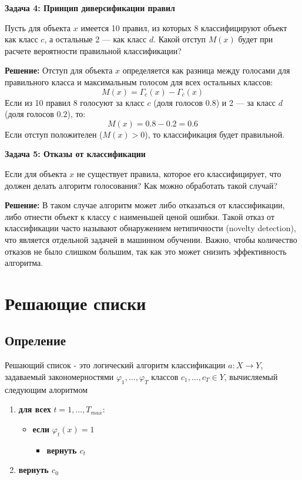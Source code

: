 \textbf{Задача 4: Принцип диверсификации правил}

Пусть для объекта $x$ имеется 10 правил, из которых 8 классифицируют объект как класс $c$, а остальные 2 — как класс $d$. Какой отступ $M(x)$ будет при расчете вероятности правильной классификации?

\textbf{Решение:}
Отступ для объекта $x$ определяется как разница между голосами для правильного класса и максимальным голосом для всех остальных классов:
\[
    M(x) = \Gamma_c(x) - \Gamma_{\overline{c}}(x)
\]
Если из 10 правил 8 голосуют за класс $c$ (доля голосов $0.8$) и 2 — за класс $d$ (доля голосов $0.2$), то:
\[
    M(x) = 0.8 - 0.2 = 0.6
\]
Если отступ положителен ($M(x) > 0$), то классификация будет правильной.

\textbf{Задача 5: Отказы от классификации}

Если для объекта $x$ не существует правила, которое его классифицирует, что должен делать алгоритм голосования? Как можно обработать такой случай?

\textbf{Решение:}
В таком случае алгоритм может либо отказаться от классификации, либо отнести объект к классу с наименьшей ценой ошибки. Такой отказ от классификации часто называют обнаружением нетипичности (novelty detection), что является отдельной задачей в машинном обучении. Важно, чтобы количество отказов не было слишком большим, так как это может снизить эффективность алгоритма.

\section{Решающие списки}
\subsection{Опреление}
Решающий список - это логический алгоритм классификации $a: X \xrightarrow{} Y$, задаваемый закономерностями $\varphi_1, \dots, \varphi_T$ классов $c_1, \dots, c_T \in Y$, вычисляемый следующим алоритмом

\begin{enumerate}
    \item \textbf{для всех} $t = 1, \dots, T_{max}$:
          \begin{itemize}
              \item \textbf{если} $\varphi_t(x) = 1$
                    \begin{itemize}
                        \item \textbf{вернуть $c_t$}
                    \end{itemize}
          \end{itemize}
          
    \item \textbf{вернуть $c_0$}
\end{enumerate}

